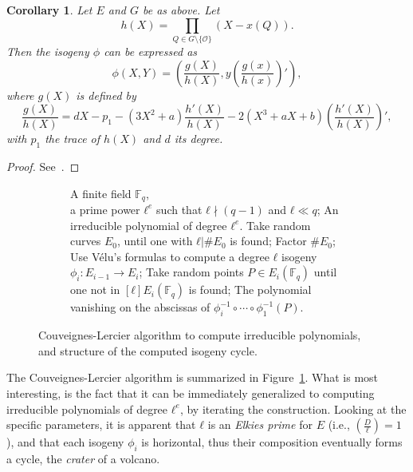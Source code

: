 \documentclass[10pt]{article}
\theoremstyle{plain}
\newtheorem{corollary}[theorem]{Corollary}
\theoremstyle{definition}
\def\F{\ensuremath{\mathbb{F}}}
\def\O{\ensuremath{\mathcal{O}}}
\begin{document}
\begin{corollary}
  Let $E$ and $G$ be as above. %
  Let
  \[h(X) = \prod_{Q∈G\setminus\{\O\}}(X-x(Q)).\]
  Then the isogeny $ϕ$ can be expressed as
  \[ϕ(X,Y) = \left(\frac{g(X)}{h(X)}, y\left(\frac{g(x)}{h(x)}\right)'\right),\]
  where $g(X)$ is defined by
  \[\frac{g(X)}{h(X)} = dX-p_1-(3X^2+a)\frac{h'(X)}{h(X)}
    - 2(X^3+aX+b)\left(\frac{h'(X)}{h(X)}\right)',\]
  with $p_1$ the trace of $h(X)$ and $d$ its degree.
\end{corollary}
\begin{proof}
  See~\cite[\S8.2]{df+thesis}.
\end{proof}

\begin{figure}
  \begin{subfigure}{0.65\textwidth}
    \begin{algorithmic}[1]
      \REQUIRE A finite field $\F_q$,\\
      a prime power $ℓ^e$ such that $ℓ\nmid(q-1)$ and $ℓ\ll q$;
      \ENSURE An irreducible polynomial of degree $ℓ^e$.
      \STATE Take random curves $E_0$, until one with $ℓ|\#E_0$ is found;
      \STATE Factor $\#E_0$;
      \STATE Use V\'elu's formulas to compute a degree $ℓ$ isogeny $ϕ_i:E_{i-1}\to E_i$;
      \ENDFOR
      \STATE Take random points $P\in E_i(\F_q)$ until one not in $[ℓ]E_i(\F_q)$ is found;
      \RETURN The polynomial vanishing on the abscissas of $ϕ_i^{-1}∘\cdots∘ϕ_1^{-1}(P)$.
    \end{algorithmic}
  \end{subfigure}
  \hfill
  \begin{subfigure}{0.2\textwidth}
  \end{subfigure}
  
  \caption{Couveignes-Lercier algorithm to compute irreducible
    polynomials, and structure of the computed isogeny cycle.}
  \label{fig:CL}
\end{figure}

The Couveignes-Lercier algorithm is summarized in
Figure~\ref{fig:CL}. %
What is most interesting, is the fact that it can be immediately
generalized to computing irreducible polynomials of degree $ℓ^e$, by
iterating the construction. %
Looking at the specific parameters, it is apparent that $ℓ$ is an
\emph{Elkies prime} for $E$ (i.e., $\left(\frac{D}{ℓ}\right)=1$), and
that each isogeny $ϕ_i$ is horizontal, thus their composition
eventually forms a cycle, the \emph{crater} of a volcano.
\end{document}
